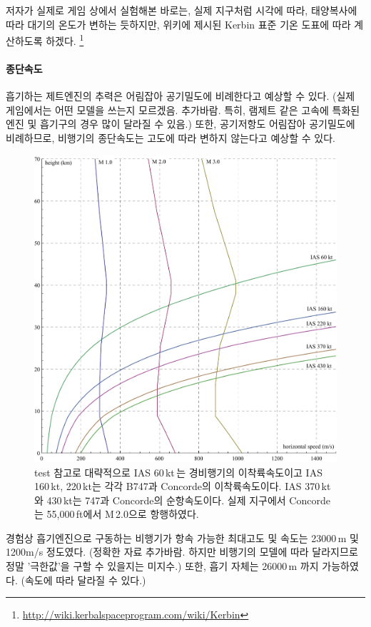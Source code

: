 \documentclass[9pt,twoside,openany]{amsbook}
\begin{document}
저자가 실제로 게임 상에서 실험해본 바로는, 실제 지구처럼 시각에 따라, 태양복사에 따라 대기의 온도가 변하는 듯하지만, 위키에 제시된 Kerbin 표준 기온 도표에 따라 계산하도록 하겠다. \footnote{\url{http://wiki.kerbalspaceprogram.com/wiki/Kerbin}}

\paragraph{종단속도}
흡기하는 제트엔진의 추력은 어림잡아 공기밀도에 비례한다고 예상할 수 있다. (실제 게임에서는 어떤 모델을 쓰는지 모르겠음. 추가바람. 특히, 램제트 같은 고속에 특화된 엔진 및 흡기구의 경우 많이 달라질 수 있음.) 또한, 공기저항도 어림잡아 공기밀도에 비례하므로, 비행기의 종단속도는 고도에 따라 변하지 않는다고 예상할 수 있다.
\begin{figure}
\includegraphics[width=\textwidth]{ias.pdf}
\caption{test 참고로 대략적으로 IAS 60\,kt\,는 경비행기의 이착륙속도이고 IAS 160\,kt, 220\,kt는 각각 B747과 Concorde의 이착륙속도이다. IAS 370\,kt와 430\,kt는 747과 Concorde의 순항속도이다. 실제 지구에서 Concorde는 55,000\,ft에서 M\,2.0으로 항행하였다.}
\end{figure}

경험상 흡기엔진으로 구동하는 비행기가 항속 가능한 최대고도 및 속도는 23000\,m 및 1200m/s 정도였다. (정확한 자료 추가바람. 하지만 비행기의 모델에 따라 달라지므로 정말 '극한값'을 구할 수 있을지는 미지수.) 
또한, 흡기 자체는 26000\,m 까지 가능하였다. (속도에 따라 달라질 수 있다.)
\end{document}
